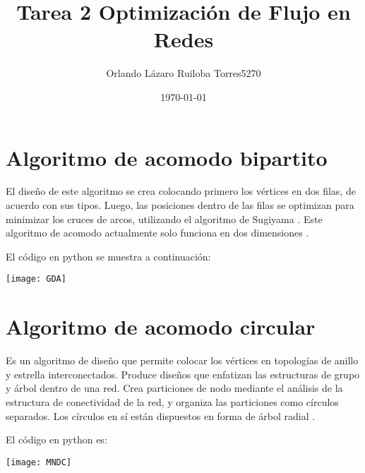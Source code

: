 \documentclass[10pt,a4paper]{article}
\author{Orlando Lázaro Ruiloba Torres\hspace{.4cm}5270}
\title{Tarea 2 Optimización de Flujo en Redes}
\date{\today}
\begin{document}
\maketitle

\section{Algoritmo de acomodo bipartito}

El diseño de este algoritmo se crea colocando primero los vértices en dos filas, de acuerdo con sus tipos. Luego, las posiciones dentro de las filas se optimizan para minimizar los cruces de arcos, utilizando el algoritmo de Sugiyama \cite{b1}. Este algoritmo de acomodo actualmente solo funciona en dos dimensiones \cite{b2}.\vspace{.4cm}

El código en python se muestra a continuación:



\begin{center}

\texttt{[image: GDA]}

\end{center}

\section{Algoritmo de acomodo circular}

Es un algoritmo de diseño que permite colocar los vértices en topologías de anillo y estrella interconectados. Produce diseños que enfatizan las estructuras de grupo y árbol dentro de una red. Crea particiones de nodo mediante el análisis de la estructura de conectividad de la red, y organiza las particiones como círculos separados. Los círculos en sí están dispuestos en forma de árbol radial \cite{c}.\newpage

El código en python es:
 


\begin{center}

\texttt{[image: MNDC]}

\end{center}
\end{document}
